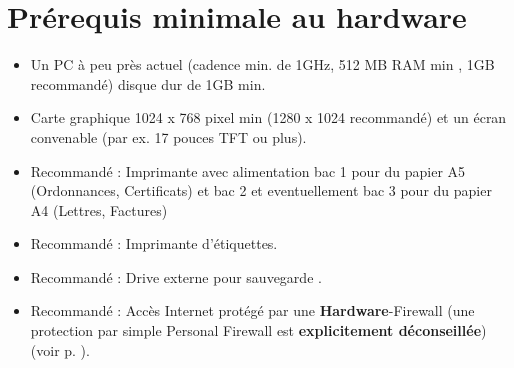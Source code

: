 %

\section{Prérequis minimale au hardware}
\label{systemvoraussetzungen}
\begin{itemize}
 \item Un PC à peu près actuel (cadence min. de 1GHz, 512 MB RAM min , 1GB recommandé) disque dur de 1GB min.
\item  Carte graphique 1024 x 768 pixel min (1280 x 1024 recommandé) et un écran convenable (par ex. 17 pouces TFT ou plus).
\item Recommandé : Imprimante avec alimentation bac 1 pour du papier A5 (Ordonnances, Certificats) et bac 2 et eventuellement bac 3 pour du papier A4 (Lettres, Factures)
\item Recommandé : Imprimante d'étiquettes.
\item Recommandé : Drive externe pour sauvegarde .
\item Recommandé : Accès Internet protégé par une \textbf{Hardware}-Firewall (une protection par simple Personal Firewall est  \textbf{explicitement déconseillée}) (voir p. \pageref{sicherheit}).
\end{itemize}

